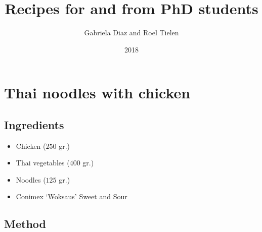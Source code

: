 \documentclass[a4paper,12pt]{report}
\title{Recipes for and from PhD students}
\date{2018\\ }
\author{Gabriela Diaz and Roel Tielen}
\begin{document}
\maketitle
\tableofcontents

\chapter{Thai noodles with chicken}

\section*{Ingredients}

\begin{itemize}
\item Chicken ($250$ gr.)
\item Thai vegetables ($400$ gr.)
\item Noodles ($125$ gr.)
\item Conimex `Woksaus' Sweet and Sour
\end{itemize}

\section*{Method}
\end{document}

